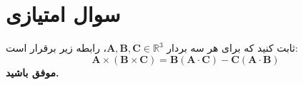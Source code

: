 \documentclass[a4paper,16pt]{article}
\begin{document}
	\section{سوال امتیازی}
	
	ثابت کنید که برای هر سه بردار $\mathbf{A},\mathbf{B},\mathbf{C}\in\mathbb{R}^3$، رابطه زیر برقرار است:
	\[
	\boxed{\;\mathbf{A}\times(\mathbf{B}\times\mathbf{C})
		=\mathbf{B}(\mathbf{A}\cdot\mathbf{C})-\mathbf{C}(\mathbf{A}\cdot\mathbf{B})\;}
	\]
	\vspace{10pt}
	\textbf{موفق باشید.}
\end{document}
